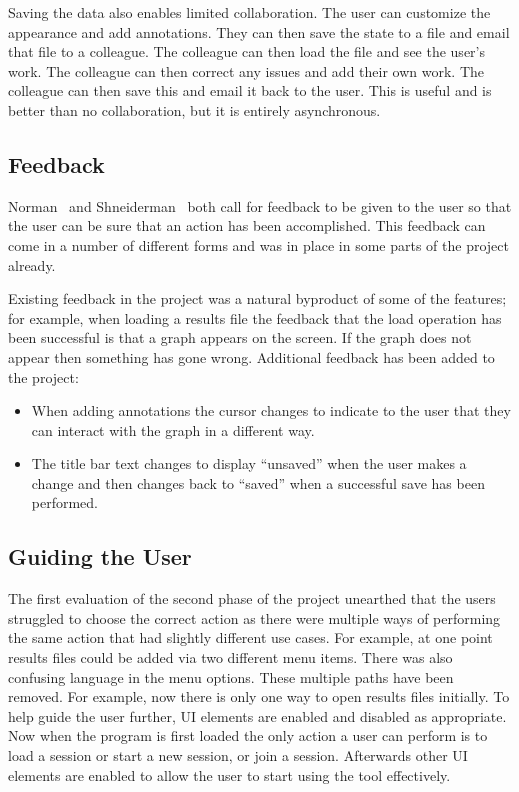 Saving the data also enables limited collaboration.  The user can customize the appearance and add annotations.  They can then save the state to a file and email that file to a colleague.  The colleague can then load the file and see the user's work.  The colleague can then correct any issues and add their own work.  The colleague can then save this and email it back to the user.  This is useful and is better than no collaboration, but it is entirely asynchronous.

\subsection{Feedback}
\label{sec:feedback}
Norman~\cite{normsev} and Shneiderman~\cite{shgold} both call for feedback to be given to the user so that the user can be sure that an action has been accomplished.  This feedback can come in a number of different forms and was in place in some parts of the project already.

Existing feedback in the project was a natural byproduct of some of the features; for example, when loading a results file the feedback that the load operation has been successful is that a graph appears on the screen. If the graph does not appear then something has gone wrong.  Additional feedback has been added to the project:
\begin{itemize}
\item When adding annotations the cursor changes to indicate to the user that they can interact with the graph in a different way.
\item The title bar text changes to display ``unsaved'' when the user makes a change and then changes back to ``saved'' when a successful save has been performed.
\end{itemize}

\subsection{Guiding the User}
\label{sec:guiding}

The first evaluation of the second phase of the project unearthed that the users struggled to choose the correct action as there were multiple ways of performing the same action that had slightly different use cases.  For example, at one point results files could be added via two different menu items.  There was also confusing language in the menu options.  These multiple paths have been removed. For example, now there is only one way to open results files initially.  To help guide the user further, \ac{UI} elements are enabled and disabled as appropriate.  Now when the program is first loaded the only action a user can perform is to load a session or start a new session, or join a session.  Afterwards other \ac{UI} elements are enabled to allow the user to start using the tool effectively.

